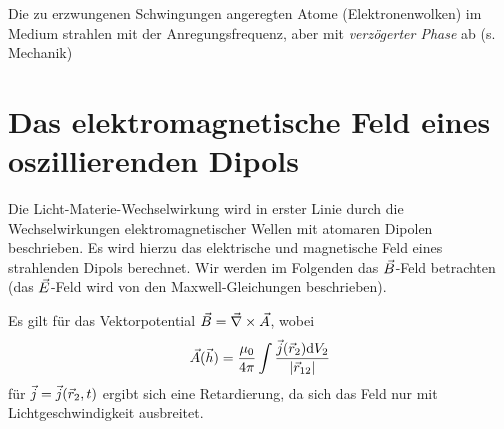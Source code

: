 Die zu erzwungenen Schwingungen angeregten Atome (Elektronenwolken) im
Medium strahlen mit der Anregungsfrequenz, aber mit \emph{verzögerter
  Phase} ab (s. Mechanik)


\section{Das elektromagnetische Feld eines oszillierenden Dipols}
Die Licht-Materie-Wechselwirkung wird in erster Linie durch die
Wechselwirkungen elektromagnetischer Wellen mit atomaren Dipolen
beschrieben. Es wird hierzu das elektrische und magnetische Feld eines
strahlenden Dipols berechnet.
Wir werden im Folgenden das $\vec{B}$-Feld betrachten (das $\vec{E}$-Feld
wird von den Maxwell-Gleichungen beschrieben).

Es gilt für das Vektorpotential $\vec{B}=\vec{\nabla}\times\vec{A}$, wobei
\begin{gather*}
  \vec{A} (\vec{h}) = \frac{\mu_0}{4\pi} \int 
  \frac{\vec{j}(\vec{r}_2)\mathrm{d} V_2}{|\vec{r}_{12}|}
\end{gather*}
 für $\vec{j}=\vec{j}(\vec{r}_2,t)$ ergibt sich eine
Retardierung, da sich das Feld nur mit Lichtgeschwindigkeit
ausbreitet.

